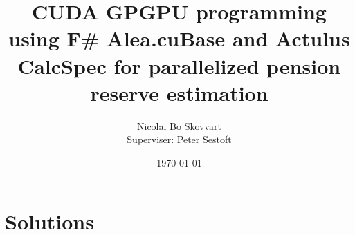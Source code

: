 \documentclass{llncs}
\title{CUDA GPGPU programming using F\# Alea.cuBase and Actulus CalcSpec for parallelized pension reserve estimation}
\author{Nicolai Bo Skovvart \email{nbsk@itu.dk}\\Superviser: Peter Sestoft}
\date{\today}
\institute{IT University of Copenhagen}
\begin{document}
	
	
	\setcounter{page}{1}
	
	\maketitle

	

	\tableofcontents
	\listoffigures

	\clearpage	

	
	

	\section{Solutions}
	
	
	

	
	
	
	
	
	
	
    \clearpage
	\appendix
	\addappheadtotoc
	
\end{document}
